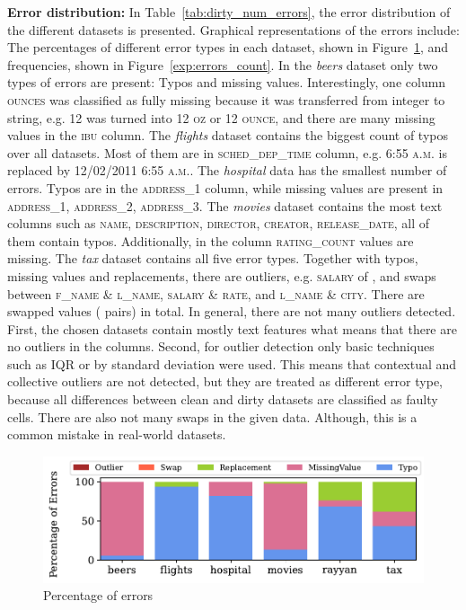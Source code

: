 \textbf{Error distribution: } 
In Table~\ref{tab:dirty_num_errors}, the error distribution of the different datasets is presented. 
Graphical representations of the errors include: The percentages of different error types in each dataset, shown in Figure~\ref{exp:errors_percent}, and frequencies, shown in Figure~\ref{exp:errors_count}.
In the \textit{beers} dataset only two types of errors are present: Typos and missing values. 
Interestingly, one column \textsc{ounces} was classified as fully missing because it was transferred from integer to string, e.g. \textsc{12} was turned into \textsc{12 oz} or \textsc{12 ounce}, and there are many missing values in the \textsc{ibu} column.
The \textit{flights} dataset contains the biggest count of typos over all  datasets. 
Most of them are in \textsc{sched\_dep\_time} column, e.g. \textsc{6:55 a.m.} is replaced by \textsc{12/02/2011 6:55 a.m.}.
The \textit{hospital} data has the smallest number of errors. 
Typos are in the \textsc{address\_1} column, while missing values are present in \textsc{address\_1}, \textsc{address\_2}, \textsc{address\_3}.
The \textit{movies} dataset contains the most text columns such as \textsc{name}, \textsc{description}, \textsc{director}, \textsc{creator}, \textsc{release\_date}, all of them contain typos. Additionally, in the column \textsc{rating\_count}  values are missing.
The \textit{tax} dataset contains all five error types. 
Together with typos, missing values and replacements, there are outliers, e.g. \textsc{salary} of , and swaps between \textsc{f\_name} \& \textsc{l\_name}, \textsc{salary} \& \textsc{rate}, and \textsc{l\_name} \& \textsc{city}. 
There are  swapped values ( pairs) in total.
In general, there are not many outliers detected.
First, the chosen datasets contain mostly text features what means that there are no outliers in the columns.
Second, for outlier detection only basic techniques such as IQR or by standard deviation were used. 
This means that contextual and collective outliers are not detected, but they are treated as different error type, because all differences between clean and dirty datasets are classified as faulty cells.
There are also not many swaps in the given data.
Although, this is a common mistake in real-world datasets.

\begin{figure}[!t]
    \centering
    \includegraphics[width=\textwidth]{figures/plot/error_percent/errors_percent.pdf}
    \caption{Percentage of errors}
    \label{exp:errors_percent}
\end{figure}


